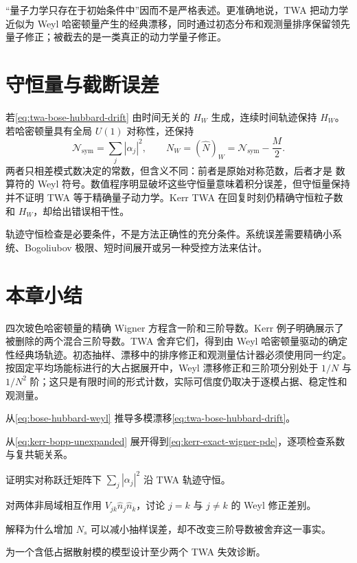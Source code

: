 “量子力学只存在于初始条件中”因而不是严格表述。更准确地说，TWA 把动力学近似为 Weyl 哈密顿量产生的经典漂移，同时通过初态分布和观测量排序保留领先量子修正；被截去的是一类真正的动力学量子修正\cite{Steel1998,Sinatra2002}。

\section{守恒量与截断误差}

若\cref{eq:twa-bose-hubbard-drift} 由时间无关的 $H_W$ 生成，连续时间轨迹保持 $H_W$。若哈密顿量具有全局 $U(1)$ 对称性，还保持
\begin{equation}
  \mathcal N_{\mathrm{sym}}=\sum_j|\alpha_j|^2,
  \qquad
  N_W=(\hat N)_W=\mathcal N_{\mathrm{sym}}-\frac M2.
\end{equation}
两者只相差模式数决定的常数，但含义不同：前者是原始对称范数，后者才是
数算符的 Weyl 符号。数值程序明显破坏这些守恒量意味着积分误差，但守恒量保持并不证明 TWA 等于精确量子动力学。Kerr TWA 在回复时刻仍精确守恒粒子数和 $H_W$，却给出错误相干性。

\begin{warningbox}
轨迹守恒检查是必要条件，不是方法正确性的充分条件。系统误差需要精确小系统、Bogoliubov 极限、短时间展开或另一种受控方法来估计。
\end{warningbox}

\section*{本章小结}

四次玻色哈密顿量的精确 Wigner 方程含一阶和三阶导数。Kerr 例子明确展示了被删除的两个混合三阶导数。TWA 舍弃它们，得到由 Weyl 哈密顿量驱动的确定性经典场轨迹。初态抽样、漂移中的排序修正和观测量估计器必须使用同一约定。按固定平均场能标进行的大占据展开中，Weyl 漂移修正和三阶项分别处于 $1/N$ 与 $1/N^2$ 阶；这只是有限时间的形式计数，实际可信度仍取决于逐模占据、稳定性和观测量。

\begin{exercises}
  \item 从\cref{eq:bose-hubbard-weyl} 推导多模漂移\cref{eq:twa-bose-hubbard-drift}。
  \item 从\cref{eq:kerr-bopp-unexpanded} 展开得到\cref{eq:kerr-exact-wigner-pde}，逐项检查系数与复共轭关系。
  \item 证明实对称跃迁矩阵下 $\sum_j|\alpha_j|^2$ 沿 TWA 轨迹守恒。
  \item 对两体非局域相互作用 $V_{jk}\hat n_j\hat n_k$，讨论 $j=k$ 与 $j\neq k$ 的 Weyl 修正差别。
  \item 解释为什么增加 $N_s$ 可以减小抽样误差，却不改变三阶导数被舍弃这一事实。
  \item 为一个含低占据散射模的模型设计至少两个 TWA 失效诊断。
\end{exercises}
